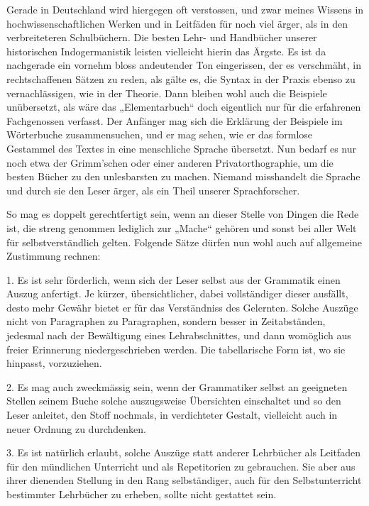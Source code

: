 \largerpage[-1]
Gerade in Deutschland wird hiergegen oft verstossen, und zwar meines Wissens in hochwissenschaftlichen Werken und in Leitfäden für  noch viel ärger, als in den verbreiteteren Schulbüchern. Die besten Lehr- und Handbücher unserer historischen Indogermanistik leisten vielleicht hierin das Ärgste. Es ist da nachgerade ein vornehm bloss andeutender Ton eingerissen, der es verschmäht, in rechtschaffenen Sätzen zu reden, als gälte es, die Syntax in der Praxis ebenso zu vernachlässigen, wie in der Theorie. Dann bleiben wohl auch die Beispiele unübersetzt, als wäre das „Elementarbuch“ doch eigentlich nur für die erfahrenen Fachgenossen verfasst. Der Anfänger mag sich die Erklärung der Beispiele im Wörterbuche zusammensuchen, und er mag sehen, wie er das formlose Gestammel des Textes in eine menschliche Sprache übersetzt. Nun bedarf es nur noch etwa der Grimm’schen oder einer anderen Privatorthographie, um die besten Bücher zu den unlesbarsten zu machen. Niemand misshandelt die Sprache und durch sie den Leser ärger, als ein Theil unserer Sprachforscher.

So mag es doppelt gerechtfertigt sein, wenn an dieser Stelle von Dingen die Rede ist, die streng genommen lediglich zur „Mache“ gehören und sonst bei aller Welt für selbstverständlich gelten. Folgende Sätze dürfen nun wohl auch auf allgemeine Zustimmung rechnen:

1. Es ist sehr förderlich, wenn sich der Leser selbst aus der Grammatik einen Auszug anfertigt. Je kürzer, übersichtlicher, dabei vollständiger dieser ausfällt, desto mehr Gewähr bietet er für das Verständniss des Gelernten. Solche Auszüge  nicht von Paragraphen zu Paragraphen, sondern besser in Zeitabständen, jedesmal nach der Bewältigung eines Lehrabschnittes, und dann womöglich aus freier Erinnerung niedergeschrieben werden. Die tabellarische Form ist, wo sie hinpasst, vorzuziehen.

2. Es mag auch zweckmässig sein, wenn der Grammatiker selbst an geeigneten Stellen seinem Buche solche auszugsweise Übersichten \label{fp.114} einschaltet und so den Leser anleitet, den Stoff nochmals, in verdichteter Gestalt, vielleicht auch in neuer Ordnung zu durchdenken.

\label{sp.109}

3. Es ist natürlich erlaubt, solche Auszüge statt anderer Lehrbücher als Leitfaden für den mündlichen Unterricht und als Repetitorien zu gebrauchen. Sie aber aus ihrer dienenden Stellung in den Rang selbständiger, auch für den Selbstunterricht bestimmter Lehrbücher zu erheben, sollte nicht gestattet sein.

